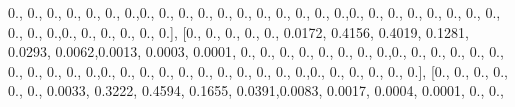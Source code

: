 \documentclass[
]{book}
\newenvironment{Shaded}{\begin{snugshade}}{\end{snugshade}}
\newcommand{\FloatTok}[1]{\textcolor[rgb]{0.00,0.00,0.81}{#1}}
\newcommand{\NormalTok}[1]{#1}
\begin{document}
\begin{Shaded}
\begin{Highlighting}[]
\FloatTok{0.}\NormalTok{, }\FloatTok{0.}\NormalTok{, }\FloatTok{0.}\NormalTok{, }\FloatTok{0.}\NormalTok{, }\FloatTok{0.}\NormalTok{, }\FloatTok{0.}\NormalTok{, }\FloatTok{0.}\NormalTok{,}\FloatTok{0.}\NormalTok{, }\FloatTok{0.}\NormalTok{, }\FloatTok{0.}\NormalTok{, }\FloatTok{0.}\NormalTok{, }\FloatTok{0.}\NormalTok{, }\FloatTok{0.}\NormalTok{, }\FloatTok{0.}\NormalTok{, }\FloatTok{0.}\NormalTok{, }\FloatTok{0.}\NormalTok{, }\FloatTok{0.}\NormalTok{, }\FloatTok{0.}\NormalTok{,}\FloatTok{0.}\NormalTok{, }\FloatTok{0.}\NormalTok{,}
\FloatTok{0.}\NormalTok{, }\FloatTok{0.}\NormalTok{, }\FloatTok{0.}\NormalTok{, }\FloatTok{0.}\NormalTok{, }\FloatTok{0.}\NormalTok{, }\FloatTok{0.}\NormalTok{, }\FloatTok{0.}\NormalTok{, }\FloatTok{0.}\NormalTok{, }\FloatTok{0.}\NormalTok{,}\FloatTok{0.}\NormalTok{, }\FloatTok{0.}\NormalTok{, }\FloatTok{0.}\NormalTok{, }\FloatTok{0.}\NormalTok{, }\FloatTok{0.}\NormalTok{, }\FloatTok{0.}\NormalTok{], [}\FloatTok{0.}\NormalTok{, }\FloatTok{0.}\NormalTok{, }\FloatTok{0.}\NormalTok{, }\FloatTok{0.}\NormalTok{, }\FloatTok{0.}\NormalTok{,}
\FloatTok{0.0172}\NormalTok{, }\FloatTok{0.4156}\NormalTok{, }\FloatTok{0.4019}\NormalTok{, }\FloatTok{0.1281}\NormalTok{, }\FloatTok{0.0293}\NormalTok{, }\FloatTok{0.0062}\NormalTok{,}\FloatTok{0.0013}\NormalTok{, }\FloatTok{0.0003}\NormalTok{, }\FloatTok{0.0001}\NormalTok{, }\FloatTok{0.}\NormalTok{, }\FloatTok{0.}\NormalTok{,}
\FloatTok{0.}\NormalTok{, }\FloatTok{0.}\NormalTok{, }\FloatTok{0.}\NormalTok{, }\FloatTok{0.}\NormalTok{, }\FloatTok{0.}\NormalTok{, }\FloatTok{0.}\NormalTok{,}\FloatTok{0.}\NormalTok{, }\FloatTok{0.}\NormalTok{, }\FloatTok{0.}\NormalTok{, }\FloatTok{0.}\NormalTok{, }\FloatTok{0.}\NormalTok{, }\FloatTok{0.}\NormalTok{, }\FloatTok{0.}\NormalTok{, }\FloatTok{0.}\NormalTok{, }\FloatTok{0.}\NormalTok{, }\FloatTok{0.}\NormalTok{, }\FloatTok{0.}\NormalTok{,}\FloatTok{0.}\NormalTok{, }\FloatTok{0.}\NormalTok{, }\FloatTok{0.}\NormalTok{,}
\FloatTok{0.}\NormalTok{, }\FloatTok{0.}\NormalTok{, }\FloatTok{0.}\NormalTok{, }\FloatTok{0.}\NormalTok{, }\FloatTok{0.}\NormalTok{, }\FloatTok{0.}\NormalTok{, }\FloatTok{0.}\NormalTok{, }\FloatTok{0.}\NormalTok{,}\FloatTok{0.}\NormalTok{, }\FloatTok{0.}\NormalTok{, }\FloatTok{0.}\NormalTok{, }\FloatTok{0.}\NormalTok{, }\FloatTok{0.}\NormalTok{, }\FloatTok{0.}\NormalTok{], [}\FloatTok{0.}\NormalTok{, }\FloatTok{0.}\NormalTok{, }\FloatTok{0.}\NormalTok{, }\FloatTok{0.}\NormalTok{, }\FloatTok{0.}\NormalTok{, }\FloatTok{0.}\NormalTok{,}
\FloatTok{0.0033}\NormalTok{, }\FloatTok{0.3222}\NormalTok{, }\FloatTok{0.4594}\NormalTok{, }\FloatTok{0.1655}\NormalTok{, }\FloatTok{0.0391}\NormalTok{,}\FloatTok{0.0083}\NormalTok{, }\FloatTok{0.0017}\NormalTok{, }\FloatTok{0.0004}\NormalTok{, }\FloatTok{0.0001}\NormalTok{, }\FloatTok{0.}\NormalTok{, }\FloatTok{0.}\NormalTok{,}

\end{Highlighting}
\end{Shaded}
\end{document}
